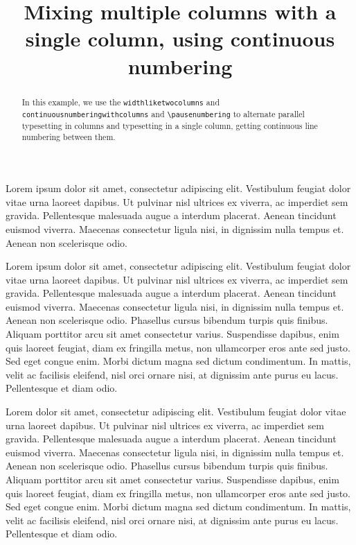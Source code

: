 \documentclass{article}
\begin{document}
\begin{english}
\date{}
\title{Mixing multiple columns with a single column, using continuous numbering}
\begin{abstract}
In this example, we use the \verb+widthliketwocolumns+ and \\ \verb+continuousnumberingwithcolumns+ and \verb+\pausenumbering+ to alternate parallel typesetting in columns and typesetting in a single column, getting continuous line numbering between them.
\end{abstract}
\end{english}
\begin{pairs}
\begin{Leftside}
\beginnumbering
\pstart
Lorem ipsum dolor sit amet, consectetur adipiscing elit. Vestibulum feugiat dolor vitae urna laoreet dapibus. Ut pulvinar nisl ultrices ex viverra, ac imperdiet sem gravida. Pellentesque malesuada augue a interdum placerat. Aenean tincidunt euismod viverra. Maecenas consectetur ligula nisi, in dignissim nulla tempus et. Aenean non scelerisque odio.
\pend
\pausenumbering
\end{Leftside}

\begin{Rightside}
\beginnumbering
\pstart
Lorem ipsum dolor sit amet, consectetur adipiscing elit. Vestibulum feugiat dolor vitae urna laoreet dapibus. Ut pulvinar nisl ultrices ex viverra, ac imperdiet sem gravida. Pellentesque malesuada augue a interdum placerat. Aenean tincidunt euismod viverra. Maecenas consectetur ligula nisi, in dignissim nulla tempus et. Aenean non scelerisque odio. Phasellus cursus bibendum turpis quis finibus. Aliquam porttitor arcu sit amet consectetur varius. Suspendisse dapibus, enim quis laoreet feugiat, diam ex fringilla metus, non ullamcorper eros ante sed justo. Sed eget congue enim. Morbi dictum magna sed dictum condimentum. In mattis, velit ac facilisis eleifend, nisl orci ornare nisi, at dignissim ante purus eu lacus. Pellentesque et diam odio.
\pend
\pausenumbering
\end{Rightside}

\end{pairs}
\Columns

\resumenumbering
\pstart
Lorem  dolor sit amet, consectetur adipiscing elit. Vestibulum feugiat dolor vitae urna laoreet dapibus. Ut pulvinar nisl ultrices ex viverra, ac imperdiet sem gravida. Pellentesque malesuada augue a interdum placerat. Aenean tincidunt euismod viverra. Maecenas consectetur ligula nisi, in dignissim nulla tempus et. Aenean non scelerisque odio. Phasellus cursus bibendum turpis quis finibus. Aliquam porttitor arcu sit amet consectetur varius. Suspendisse dapibus, enim quis laoreet feugiat, diam ex fringilla metus, non ullamcorper eros ante sed justo. Sed eget congue enim. Morbi dictum magna sed dictum condimentum. In mattis, velit ac facilisis eleifend, nisl orci ornare nisi, at dignissim ante purus eu lacus. Pellentesque et diam odio.
\pend
\pausenumbering
\end{document}

